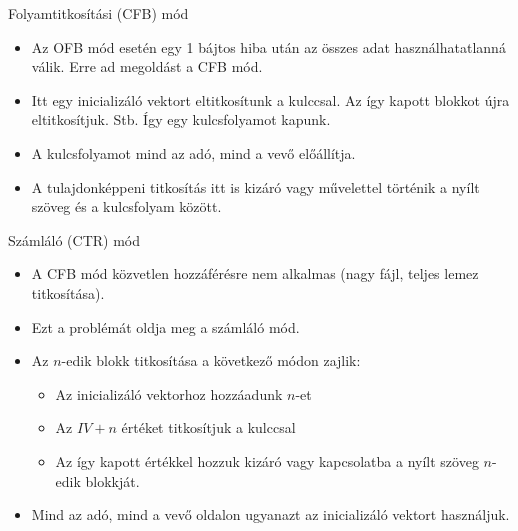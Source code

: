 \documentclass[12 pt]{beamer}
\begin{document}
\begin{frame}{Folyamtitkosítási (CFB) mód}
  \begin{itemize}
    \item{Az OFB mód esetén egy 1 bájtos hiba után az összes adat használhatatlanná válik. Erre ad megoldást a CFB mód.}
    \item{Itt egy inicializáló vektort eltitkosítunk a kulccsal. Az így kapott blokkot újra eltitkosítjuk. Stb. Így egy kulcsfolyamot kapunk.}
    \item{A kulcsfolyamot mind az adó, mind a vevő előállítja.}
    \item{A tulajdonképpeni titkosítás itt is kizáró vagy művelettel történik a nyílt szöveg és a kulcsfolyam között.}
  \end{itemize}

%
%      
%
\end{frame}

\begin{frame}{Számláló (CTR) mód}
  \begin{itemize}
    \item{A CFB mód közvetlen hozzáférésre nem alkalmas (nagy fájl, teljes lemez titkosítása).}
    \item{Ezt a problémát oldja meg a számláló mód.}
    \item{Az $n$-edik blokk titkosítása a következő módon zajlik:}
      \begin{itemize}
        \item{Az inicializáló vektorhoz hozzáadunk $n$-et}
        \item{Az $IV + n$ értéket titkosítjuk a kulccsal}
        \item{Az így kapott értékkel hozzuk kizáró vagy kapcsolatba a nyílt szöveg $n$-edik blokkját.}
      \end{itemize}
    \item{Mind az adó, mind a vevő oldalon ugyanazt az inicializáló vektort használjuk.}
  \end{itemize}


\end{frame}
\end{document}
